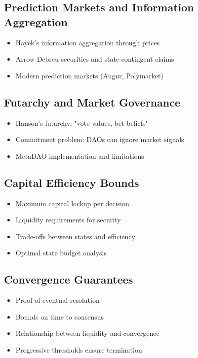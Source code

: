 \documentclass{article}
\begin{document}
\subsection{Prediction Markets and Information Aggregation}
\begin{itemize}
   \item Hayek's information aggregation through prices
   \item Arrow-Debreu securities and state-contingent claims
   \item Modern prediction markets (Augur, Polymarket)
\end{itemize}

\subsection{Futarchy and Market Governance}
\begin{itemize}
   \item Hanson's futarchy: "vote values, bet beliefs"
   \item Commitment problem: DAOs can ignore market signals
   \item MetaDAO implementation and limitations
\end{itemize}

\subsection{Capital Efficiency Bounds}
\begin{itemize}
    \item Maximum capital lockup per decision
    \item Liquidity requirements for security
    \item Trade-offs between states and efficiency
    \item Optimal state budget analysis
\end{itemize}

\subsection{Convergence Guarantees}
\begin{itemize}
    \item Proof of eventual resolution
    \item Bounds on time to consensus
    \item Relationship between liquidity and convergence
    \item Progressive thresholds ensure termination
\end{itemize}
\end{document}
